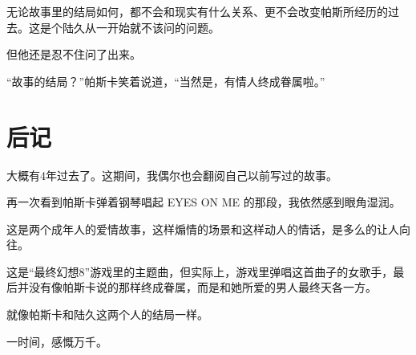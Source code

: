 无论故事里的结局如何，都不会和现实有什么关系、更不会改变帕斯所经历的过去。这是个陆久从一开始就不该问的问题。

但他还是忍不住问了出来。

“故事的结局？”帕斯卡笑着说道，“当然是，有情人终成眷属啦。”

\section{后记}

大概有4年过去了。这期间，我偶尔也会翻阅自己以前写过的故事。

再一次看到帕斯卡弹着钢琴唱起 EYES ON ME 的那段，我依然感到眼角湿润。

这是两个成年人的爱情故事，这样煽情的场景和这样动人的情话，是多么的让人向往。

这是“最终幻想8”游戏里的主题曲，但实际上，游戏里弹唱这首曲子的女歌手，最后并没有像帕斯卡说的那样终成眷属，而是和她所爱的男人最终天各一方。

就像帕斯卡和陆久这两个人的结局一样。

一时间，感慨万千。
\\

